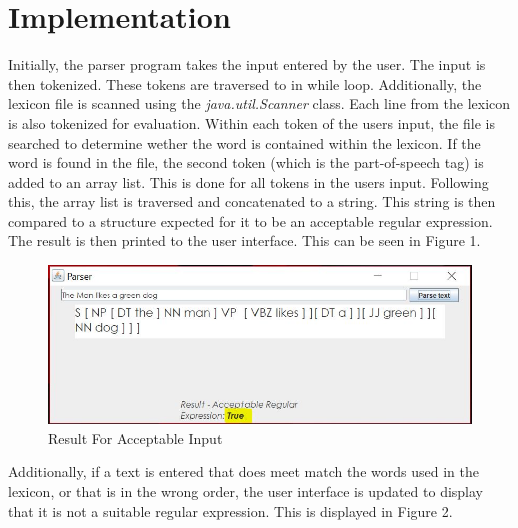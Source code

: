

\section*{Implementation}

Initially, the parser program takes the input entered by the user. The input is then tokenized. These tokens are traversed to in while loop. Additionally, the lexicon file is scanned using the \textit{java.util.Scanner} class. Each line from the lexicon is also tokenized for evaluation. Within each token of the users input, the file is searched to determine wether the word is contained within the lexicon. If the word is found in the file, the second token (which is the part-of-speech tag) is added to an array list. This is done for all tokens in the users input. Following this, the array list is traversed and concatenated to a string. This string is then compared to a structure expected for it to be an acceptable regular expression. The result is then printed to the user interface. This can be seen in Figure 1.

\begin{figure}[ht]
	\begin{center}
		\advance\leftskip-3cm
		\advance\rightskip-3cm
		\includegraphics[keepaspectratio=true,scale=0.9]{__resources/true.jpg}
		\caption{Result For Acceptable Input}
		\label{onset}
	\end{center}
\end{figure}

Additionally, if a text is entered that does meet match the words used in the lexicon, or that is in the wrong order, the user interface is updated to display that it is not a suitable regular expression. This is displayed in Figure 2.

